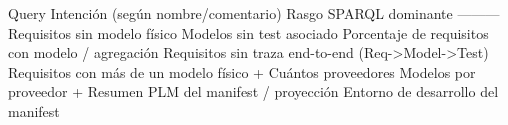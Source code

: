 {}\markdownRendererPipe{} Query \markdownRendererPipe{} Intención (según nombre/comentario) \markdownRendererPipe{} Rasgo SPARQL dominante \markdownRendererPipe{} \markdownRendererPipe{}---\markdownRendererPipe{}---\markdownRendererPipe{}---\markdownRendererPipe{} \markdownRendererPipe{}  \markdownRendererPipe{} Requisitos sin modelo físico \markdownRendererPipe{}  \markdownRendererPipe{} \markdownRendererPipe{}  \markdownRendererPipe{} Modelos sin test asociado \markdownRendererPipe{}  \markdownRendererPipe{} \markdownRendererPipe{}  \markdownRendererPipe{} Porcentaje de requisitos con modelo \markdownRendererPipe{}  / agregación \markdownRendererPipe{} \markdownRendererPipe{}  \markdownRendererPipe{} Requisitos sin traza end-to-end (Req->Model->Test) \markdownRendererPipe{}  \markdownRendererPipe{} \markdownRendererPipe{}  \markdownRendererPipe{} Requisitos con más de un modelo físico \markdownRendererPipe{}  +  \markdownRendererPipe{} \markdownRendererPipe{}  \markdownRendererPipe{} Cuántos proveedores \markdownRendererPipe{}  \markdownRendererPipe{} \markdownRendererPipe{}  \markdownRendererPipe{} Modelos por proveedor \markdownRendererPipe{}  +  \markdownRendererPipe{} \markdownRendererPipe{}  \markdownRendererPipe{} Resumen PLM del manifest \markdownRendererPipe{}  / proyección \markdownRendererPipe{} \markdownRendererPipe{}  \markdownRendererPipe{} Entorno de desarrollo del manifest \markdownRendererPipe{}  \markdownRendererPipe{} \markdownRendererPipe{}  